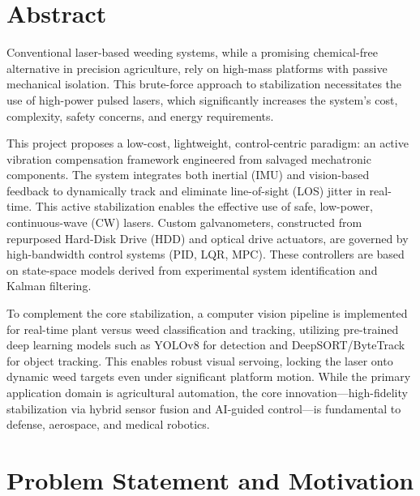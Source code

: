 \documentclass[12pt]{article}
\begin{document}
\pagestyle{plain} %
\setcounter{page}{1} %

\section*{Abstract}

Conventional laser-based weeding systems, while a promising chemical-free alternative in precision agriculture, rely on high-mass platforms with passive mechanical isolation. This brute-force approach to stabilization necessitates the use of high-power pulsed lasers, which significantly increases the system's cost, complexity, safety concerns, and energy requirements.

This project proposes a low-cost, lightweight, control-centric paradigm: an active vibration compensation framework engineered from salvaged mechatronic components. The system integrates both inertial (IMU) and vision-based feedback to dynamically track and eliminate line-of-sight (LOS) jitter in real-time. This active stabilization enables the effective use of safe, low-power, continuous-wave (CW) lasers. Custom galvanometers, constructed from repurposed Hard-Disk Drive (HDD) and optical drive actuators, are governed by high-bandwidth control systems (PID, LQR, MPC). These controllers are based on state-space models derived from experimental system identification and Kalman filtering.

To complement the core stabilization, a computer vision pipeline is implemented for real-time plant versus weed classification and tracking, utilizing pre-trained deep learning models such as YOLOv8 for detection and DeepSORT/ByteTrack for object tracking. This enables robust visual servoing, locking the laser onto dynamic weed targets even under significant platform motion. While the primary application domain is agricultural automation, the core innovation—high-fidelity stabilization via hybrid sensor fusion and AI-guided control—is fundamental to defense, aerospace, and medical robotics.

\vspace{1cm}

\section*{Problem Statement and Motivation}
\end{document}
